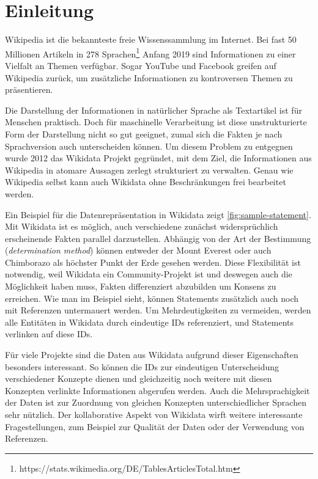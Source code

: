 %
\chapter{Einleitung}
\label{sec:intro}
Wikipedia ist die bekannteste freie Wissenssammlung im Internet.
Bei fast 50 Millionen Artikeln in 278 Sprachen\footnote{https://stats.wikimedia.org/DE/TablesArticlesTotal.htm} Anfang 2019 sind Informationen zu einer Vielfalt an Themen verfügbar.
Sogar YouTube und Facebook greifen auf Wikipedia zurück, um zusätzliche Informationen zu kontroversen Themen zu präsentieren.\cite{youtube-facebook-wp}


Die Darstellung der Informationen in natürlicher Sprache als Textartikel ist für Menschen praktisch.
Doch für maschinelle Verarbeitung ist diese unstrukturierte Form der Darstellung nicht so gut geeignet, zumal sich die Fakten je nach Sprachversion auch unterscheiden können.
Um diesem Problem zu entgegnen wurde 2012 das Wikidata Projekt gegründet, mit dem Ziel, die Informationen aus Wikipedia in atomare Aussagen zerlegt strukturiert zu verwalten\cite{wikidata}.
Genau wie Wikipedia selbst kann auch Wikidata ohne Beschränkungen frei bearbeitet werden.

Ein Beispiel für die Datenrepräsentation in Wikidata zeigt \cref{fig:sample-statement}.
Mit Wikidata ist es möglich, auch verschiedene zunächst widersprüchlich erscheinende Fakten parallel darzustellen.
Abhängig von der Art der Bestimmung (\emph{determination method}) können entweder der Mount Everest oder auch Chimborazo als höchster Punkt der Erde gesehen werden.
Diese Flexibilität ist notwendig, weil Wikidata ein Community-Projekt ist und deswegen auch die Möglichkeit haben muss, Fakten differenziert abzubilden um Konsens zu erreichen.
Wie man im Beispiel sieht, können Statements zusätzlich auch noch mit Referenzen untermauert werden.
Um Mehrdeutigkeiten zu vermeiden, werden alle Entitäten in Wikidata durch eindeutige IDs referenziert, und Statements verlinken auf diese IDs.

Für viele Projekte sind die Daten aus Wikidata aufgrund dieser Eigenschaften besonders interessant.
So können die IDs zur eindeutigen Unterscheidung verschiedener Konzepte dienen und gleichzeitig noch weitere mit diesen Konzepten verlinkte Informationen abgerufen werden.
Auch die Mehrsprachigkeit der Daten ist zur Zuordnung von gleichen Konzepten unterschiedlicher Sprachen sehr nützlich.
Der kollaborative Aspekt von Wikidata wirft weitere interessante Fragestellungen, zum Beispiel zur Qualität der Daten\cite{wd-taxonomic-hierarchies} oder der Verwendung von Referenzen\cite{wd-wk-common-references}\cite{wd-provenance-information}.

